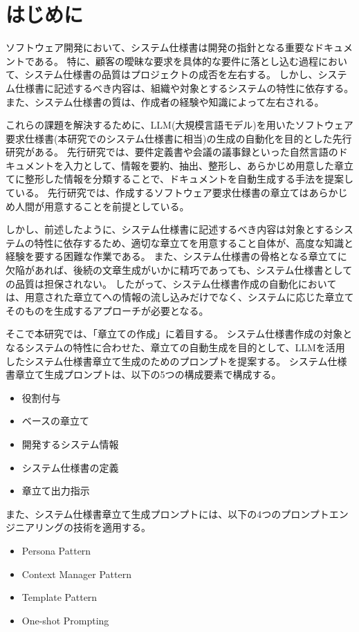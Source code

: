 \chapter{はじめに}\label{cha:Introduction}

ソフトウェア開発において、システム仕様書は開発の指針となる重要なドキュメントである\cite{rasinban}。
特に、顧客の曖昧な要求を具体的な要件に落とし込む過程において、システム仕様書の品質はプロジェクトの成否を左右する\cite{quality}。
しかし、システム仕様書に記述するべき内容は、組織や対象とするシステムの特性に依存する\cite{software_engineering}。
また、システム仕様書の質は、作成者の経験や知識によって左右される\cite{knowledge}。

これらの課題を解決するために、LLM(大規模言語モデル)\cite{whatllm}を用いたソフトウェア要求仕様書(本研究でのシステム仕様書に相当)の生成の自動化を目的とした先行研究がある\cite{reference}。
先行研究では、要件定義書や会議の議事録といった自然言語のドキュメントを入力として、情報を要約、抽出、整形し、あらかじめ用意した章立てに整形した情報を分類することで、ドキュメントを自動生成する手法を提案している。
先行研究では、作成するソフトウェア要求仕様書の章立てはあらかじめ人間が用意することを前提としている。

しかし、前述したように、システム仕様書に記述するべき内容は対象とするシステムの特性に依存するため、適切な章立てを用意すること自体が、高度な知識と経験を要する困難な作業である。
また、システム仕様書の骨格となる章立てに欠陥があれば、後続の文章生成がいかに精巧であっても、システム仕様書としての品質は担保されない。
したがって、システム仕様書作成の自動化においては、用意された章立てへの情報の流し込みだけでなく、システムに応じた章立てそのものを生成するアプローチが必要となる。

そこで本研究では、「章立ての作成」に着目する。
システム仕様書作成の対象となるシステムの特性に合わせた、章立ての自動生成を目的として、LLMを活用したシステム仕様書章立て生成のためのプロンプトを提案する。
システム仕様書章立て生成プロンプトは、以下の5つの構成要素で構成する。
\begin{itemize}
  \item 役割付与
  \item ベースの章立て  
  \item 開発するシステム情報
  \item システム仕様書の定義
  \item 章立て出力指示
\end{itemize}

また、システム仕様書章立て生成プロンプトには、以下の4つのプロンプトエンジニアリング\cite{prompt_engineering}の技術を適用する。
\begin{itemize}
  \item Persona Pattern
  \item Context Manager Pattern
  \item Template Pattern
  \item One-shot Prompting
\end{itemize}

